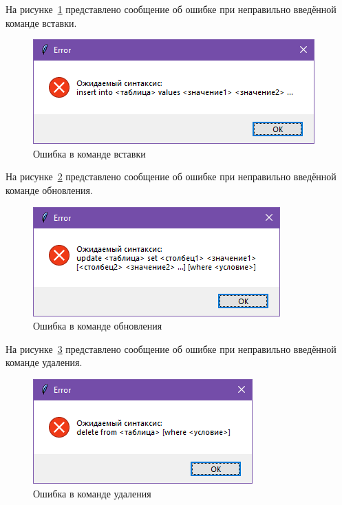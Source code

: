 На рисунке~\ref{fig:error_insert} представлено сообщение об ошибке при неправильно введённой команде вставки.
\begin{figure}[H]
	\centering
	\includegraphics[width=0.7\linewidth]{"images/ошибка вставки"}
	\caption{Ошибка в команде вставки}
	\label{fig:error_insert}
\end{figure}

На рисунке~\ref{fig:error_update} представлено сообщение об ошибке при неправильно введённой команде обновления.
\begin{figure}[H]
	\centering
	\includegraphics[width=0.7\linewidth]{"images/ошибка обновления"}
	\caption{Ошибка в команде обновления}
	\label{fig:error_update}
\end{figure}

На рисунке~\ref{fig:error_delete} представлено сообщение об ошибке при неправильно введённой команде удаления.
\begin{figure}[H]
	\centering
	\includegraphics[width=0.7\linewidth]{"images/ошибка удаления"}
	\caption{Ошибка в команде удаления}
	\label{fig:error_delete}
\end{figure}

